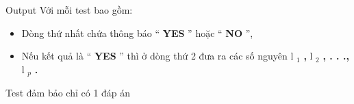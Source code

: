 Output
Với mỗi test bao gồm:
\begin{itemize}
	\item Dòng thứ nhất chứa thông báo “ \textbf{YES} ” hoặc “ \textbf{NO} ”,
	\item Nếu kết quả là “ \textbf{YES} ” thì ở dòng thứ 2 đưa ra các số nguyên l \textbf{$_ 1 $}\textbf{ , } l \textbf{$_ 2 $}\textbf{ , . . ., } l $_ p $\textbf{ . }
\end{itemize}

Test đảm bảo chỉ có 1 đáp án